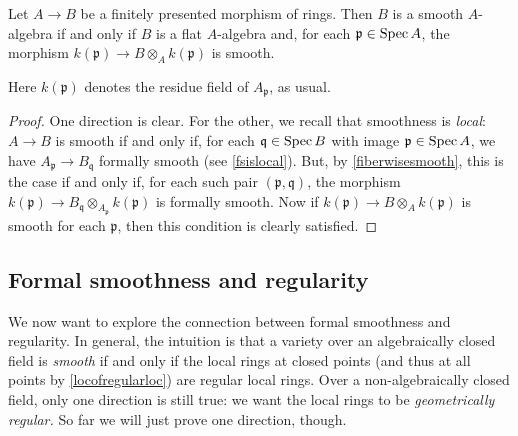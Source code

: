 \begin{theorem} 
Let $A \to B$ be a finitely presented morphism of rings. Then $B$ is a smooth
$A$-algebra if and only if $B$ is a flat $A$-algebra and, for each
$\mathfrak{p} \in \operatorname{Spec} A$, the morphism $k(\mathfrak{p}) \to B \otimes_A
k(\mathfrak{p})$ is  smooth.
\end{theorem} 
Here $k(\mathfrak{p})$ denotes the residue field of $A_{\mathfrak{p}}$, as
usual.
\begin{proof} 
One direction is clear. For the other, we recall 
that smoothness is \emph{local}: $A \to B$ is smooth if and only if, for each
$\mathfrak{q} \in \operatorname{Spec} B$ with image $\mathfrak{p} \in \operatorname{Spec} A$, we have $A_{\mathfrak{p}} \to B_{\mathfrak{q}}$
formally smooth (see \cref{fsislocal}).
But, by \cref{fiberwisesmooth}, this is the case if and only if, for each such
pair $(\mathfrak{p}, \mathfrak{q})$, the morphism $k(\mathfrak{p}) \to
B_{\mathfrak{q}} \otimes_{A_{\mathfrak{p}}} k(\mathfrak{p})$ is formally smooth.
Now if $k(\mathfrak{p}) \to B \otimes_A k(\mathfrak{p})$ is smooth for each
$\mathfrak{p}$, then this condition is clearly satisfied.
\end{proof} 

\subsection{Formal smoothness and regularity}

We now want to explore the connection between formal smoothness and regularity.
In general, the intuition is that a variety over an algebraically closed field
is \emph{smooth} if and only if the local rings at closed points (and thus at
all points by \cref{locofregularloc}) are regular local rings. 
Over a non-algebraically closed field, only one direction is still true: we
want the local rings to be \emph{geometrically regular.}
So far we will just prove one direction, though.

